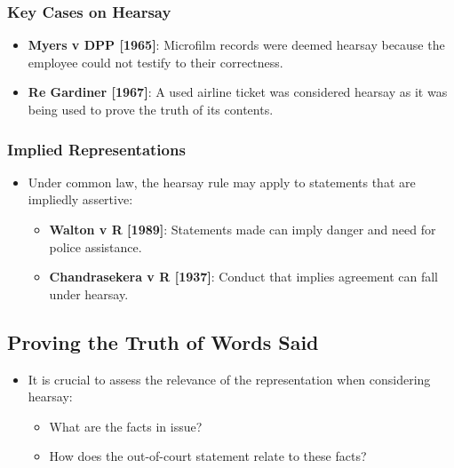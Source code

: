 \subsubsection{Key Cases on Hearsay}\label{key-cases-on-hearsay}

\begin{itemize}
\tightlist
\item
  \textbf{Myers v DPP {[}1965{]}}: Microfilm records were deemed hearsay
  because the employee could not testify to their correctness.
\item
  \textbf{Re Gardiner {[}1967{]}}: A used airline ticket was considered
  hearsay as it was being used to prove the truth of its contents.
\end{itemize}

\subsubsection{Implied Representations}\label{implied-representations}

\begin{itemize}
\tightlist
\item
  Under common law, the hearsay rule may apply to statements that are
  impliedly assertive:

  \begin{itemize}
  \tightlist
  \item
    \textbf{Walton v R {[}1989{]}}: Statements made can imply danger and
    need for police assistance.
  \item
    \textbf{Chandrasekera v R {[}1937{]}}: Conduct that implies
    agreement can fall under hearsay.
  \end{itemize}
\end{itemize}

\subsection{  Proving the Truth of Words
Said}\label{proving-the-truth-of-words-said}

\begin{itemize}
\tightlist
\item
  It is crucial to assess the relevance of the representation when
  considering hearsay:

  \begin{itemize}
  \tightlist
  \item
    What are the facts in issue?
  \item
    How does the out-of-court statement relate to these facts?
  \end{itemize}
\end{itemize}

